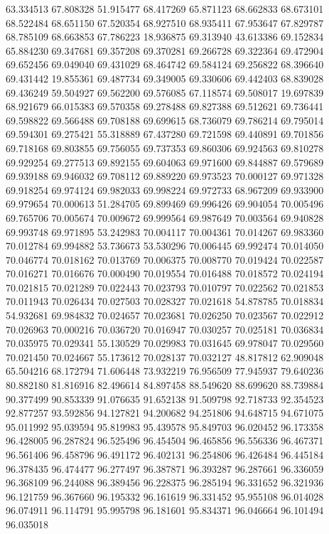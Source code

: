 63.334513
67.808328
51.915477
68.417269
65.871123
68.662833
68.673101
68.522484
68.651150
67.520354
68.927510
68.935411
67.953647
67.829787
68.785109
68.663853
67.786223
18.936875
69.313940
43.613386
69.152834
65.884230
69.347681
69.357208
69.370281
69.266728
69.322364
69.472904
69.652456
69.049040
69.431029
68.464742
69.584124
69.256822
68.396640
69.431442
19.855361
69.487734
69.349005
69.330606
69.442403
68.839028
69.436249
59.504927
69.562200
69.576085
67.118574
69.508017
19.697839
68.921679
66.015383
69.570358
69.278488
69.827388
69.512621
69.736441
69.598822
69.566488
69.708188
69.699615
68.736079
69.786214
69.795014
69.594301
69.275421
55.318889
67.437280
69.721598
69.440891
69.701856
69.718168
69.803855
69.756055
69.737353
69.860306
69.924563
69.810278
69.929254
69.277513
69.892155
69.604063
69.971600
69.844887
69.579689
69.939188
69.946032
69.708112
69.889220
69.973523
70.000127
69.971328
69.918254
69.974124
69.982033
69.998224
69.972733
68.967209
69.933900
69.979654
70.000613
51.284705
69.899469
69.996426
69.904054
70.005496
69.765706
70.005674
70.009672
69.999564
69.987649
70.003564
69.940828
69.993748
69.971895
53.242983
70.004117
70.004361
70.014267
69.983360
70.012784
69.994882
53.736673
53.530296
70.006445
69.992474
70.014050
70.046774
70.018162
70.013769
70.006375
70.008770
70.019424
70.022587
70.016271
70.016676
70.000490
70.019554
70.016488
70.018572
70.024194
70.021815
70.021289
70.022443
70.023793
70.010797
70.022562
70.021853
70.011943
70.026434
70.027503
70.028327
70.021618
54.878785
70.018834
54.932681
69.984832
70.024657
70.023681
70.026250
70.023567
70.022912
70.026963
70.000216
70.036720
70.016947
70.030257
70.025181
70.036834
70.035975
70.029341
55.130529
70.029983
70.031645
69.978047
70.029560
70.021450
70.024667
55.173612
70.028137
70.032127
48.817812
62.909048
65.504216
68.172794
71.606448
73.932219
76.956509
77.945937
79.640236
80.882180
81.816916
82.496614
84.897458
88.549620
88.699620
88.739884
90.377499
90.853339
91.076635
91.652138
91.509798
92.718733
92.354523
92.877257
93.592856
94.127821
94.200682
94.251806
94.648715
94.671075
95.011992
95.039594
95.819983
95.439578
95.849703
96.020452
96.173358
96.428005
96.287824
96.525496
96.454504
96.465856
96.556336
96.467371
96.561406
96.458796
96.491172
96.402131
96.254806
96.426484
96.445184
96.378435
96.474477
96.277497
96.387871
96.393287
96.287661
96.336059
96.368109
96.244088
96.389456
96.228375
96.285194
96.331652
96.321936
96.121759
96.367660
96.195332
96.161619
96.331452
95.955108
96.014028
96.074911
96.114791
95.995798
96.181601
95.834371
96.046664
96.101494
96.035018
